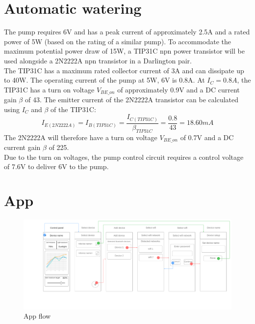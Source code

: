 \section{Automatic watering}
The pump requires 6V and has a peak current of approximately 2.5A and a rated power of 5W (based on the rating of a similar pump). To accommodate the maximum potential power draw of 15W, a TIP31C npn power transistor will be used alongside a 2N2222A npn transistor in a Darlington pair. 
\\
The TIP31C has a maximum rated collector current of 3A and can dissipate up to 40W. The operating current of the pump at 5W, 6V is 0.8A. At \(I_C = 0.8A\), the TIP31C has a turn on voltage \(V_{BE\_on}\) of approximately 0.9V and a DC current gain \(\beta\) of 43. The emitter current of the 2N2222A transistor can be calculated using \(I_C\) and \(\beta\) of the TIP31C: 
\[I_{E(2N2222A)} = I_{B(TIP31C)} = \frac{I_{C(TIP31C)}}{\beta_{TIP31C}} = \frac{0.8}{43} = 18.60mA\]
The 2N2222A will therefore have a turn on voltage \(V_{BE\_on}\) of 0.7V and a DC current gain \(\beta\) of 225. 
\\

Due to the turn on voltages, the pump control circuit requires a control voltage of 7.6V to deliver 6V to the pump. 
\section{App}

\begin{figure}[!h]
    \centering
    \includegraphics[width= \textwidth]{Report/detail_design/fig/app_flow.png}
    \caption{App flow}
    \label{fig:app_flow}
\end{figure}

